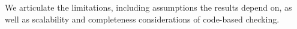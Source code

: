We articulate the limitations, including assumptions the results depend on, as well as scalability and completeness considerations of code-based checking.

